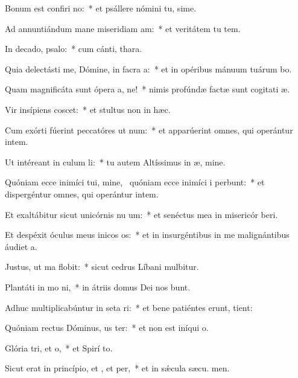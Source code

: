\item Bonum est confiri no:~* et psállere nómini tu, sime.
\item Ad annuntiándum mane miseridiam am:~* et veritátem tu  tem.
\item In decado, psalo:~* cum cánti,  thara.
\item Quia delectásti me, Dómine, in facra a:~* et in opéribus mánuum tuárum bo.
\item Quam magnificáta sunt ópera a, ne!~* nimis profúndæ factæ sunt cogitati æ.
\item Vir insípiens  coscet:~* et stultus non in hæc.
\item Cum exórti fúerint peccatóres ut num:~* et apparúerint omnes, qui operántur intem.
\item Ut intéreant in culum li:~* tu autem Altíssimus in æ, mine.
\item Quóniam ecce inimíci tui, mine,~\pscross{} quóniam ecce inimíci i perbunt:~* et dispergéntur omnes, qui operántur intem.
\item Et exaltábitur sicut unicórnis nu um:~* et senéctus mea in misericór beri.
\item Et despéxit óculus meus inicos os:~* et in insurgéntibus in me malignántibus áudiet  a.
\item Justus, ut ma flobit:~* sicut cedrus Líbani mulbitur.
\item Plantáti in mo ni,~* in átriis domus Dei nos bunt.
\item Adhuc multiplicabúntur in seta ri:~* et bene patiéntes erunt,  tient:
\item Quóniam rectus Dóminus, us ter:~* et non est iníqui  o.
\item Glória tri, et o,~* et Spirí to.
\item Sicut erat in princípio, et , et per,~* et in sǽcula sæcu. men.
